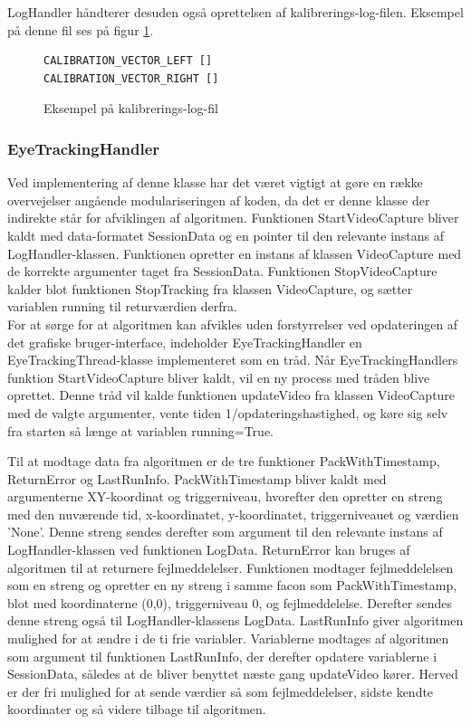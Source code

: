 \documentclass[rapport.tex]{subfiles}
\begin{document}
	LogHandler håndterer desuden også oprettelsen af kalibrerings-log-filen. Eksempel på denne fil ses på figur \ref{lis:callogfile}.
	
\begin{figure}
	\caption{Eksempel på kalibrerings-log-fil}
	\label{lis:callogfile}
	\begin{lstlisting}
CALIBRATION_VECTOR_LEFT []
CALIBRATION_VECTOR_RIGHT []
	\end{lstlisting}
\end{figure}
	
	
	\subsubsection{EyeTrackingHandler}
	Ved implementering af denne klasse har det været vigtigt at gøre en række overvejelser angående modulariseringen af koden, da det er denne klasse der indirekte står for afviklingen af algoritmen. Funktionen StartVideoCapture bliver kaldt med data-formatet SessionData og en pointer til den relevante instans af LogHandler-klassen. Funktionen opretter en instans af klassen VideoCapture med de korrekte argumenter taget fra SessionData.
	Funktionen StopVideoCapture kalder blot funktionen StopTracking fra klassen VideoCapture, og sætter variablen running til returværdien derfra.\\
	 
	For at sørge for at algoritmen kan afvikles uden forstyrrelser ved opdateringen af det grafiske bruger-interface, indeholder EyeTrackingHandler en EyeTrackingThread-klasse implementeret som en tråd. Når EyeTrackingHandlers funktion StartVideoCapture bliver kaldt, vil en ny process med tråden blive oprettet. Denne tråd vil kalde funktionen updateVideo fra klassen VideoCapture med de valgte argumenter, vente tiden 1/opdateringshastighed, og køre sig selv fra starten så længe at variablen running=True.
	
	Til at modtage data fra algoritmen er de tre funktioner PackWithTimestamp, ReturnError og LastRunInfo. PackWithTimestamp bliver kaldt med argumenterne XY-koordinat og triggerniveau, hvorefter den opretter en streng med den nuværende tid, x-koordinatet, y-koordinatet, triggerniveauet og værdien 'None'. Denne streng sendes derefter som argument til den relevante instans af LogHandler-klassen ved funktionen LogData. ReturnError kan bruges af algoritmen til at returnere fejlmeddelelser. Funktionen modtager fejlmeddelelsen som en streng og opretter en ny streng i samme facon som PackWithTimestamp, blot med koordinaterne (0,0), triggerniveau 0, og fejlmeddelelse. Derefter sendes denne streng også til LogHandler-klassens LogData. LastRunInfo giver algoritmen mulighed for at ændre i de ti frie variabler. Variablerne modtages af algoritmen som argument til funktionen LastRunInfo, der derefter opdatere variablerne i SessionData, således at de bliver benyttet næste gang updateVideo kører. Herved er der fri mulighed for at sende værdier så som fejlmeddelelser, sidste kendte koordinater og så videre tilbage til algoritmen. 
	
\end{document}
